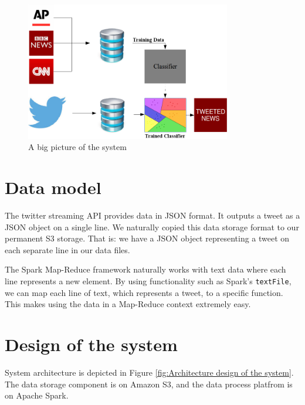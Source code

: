 \documentclass{llncs}
\begin{document}
\begin{figure}[H]
	\centering
	\includegraphics[width=0.8\textwidth]{images/bigpicture.png} 
	\caption{A big picture of the system}
	\label{fig:A big picture of the system}
\end{figure}



\section{Data model}
The twitter streaming API provides data in JSON format. It outputs a tweet as a JSON object on a single line. We naturally copied this data storage format to our permanent S3 storage. That is: we have a JSON object representing a tweet on each separate line in our data files.

The Spark Map-Reduce framework naturally works with text data where each line represents a new element. By using functionality such as Spark's \texttt{textFile}, we can map each line of text, which represents a tweet, to a specific function. This makes using the data in a Map-Reduce context extremely easy.

\section{Design of the system}
System architecture is depicted in Figure \ref{fig:Architecture design of the system}. The data storage component is on Amazon S3, and the data process platfrom is on Apache Spark. 
\end{document}
